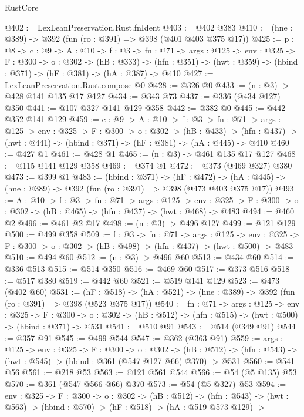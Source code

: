 \begin{lexlean}{RustCore}
\begin{coremodule}
{\begin{coremodule}
@402 := LexLeanPreservation.Rust.fnIdent
@403 := @402 @383
@410 := (hne : @389) -> @392 (fun (ro : @391) => @398 (@401 @403 @375 @17))
@425 := {p : @8} ->
  {c : @9} ->
  {A : @10} ->
  {f : @3} ->
  {fn : @71} ->
  {args : @125} ->
  {env : @325} ->
  {F : @300} ->
  {o : @302} ->
  (hB : @333) ->
  (hfn : @351) -> (hwt : @359) -> (hbind : @371) -> (hF : @381) -> (hA : @387) -> @410
@427 := LexLeanPreservation.Rust.compose @0
@428 := @326 @0
@433 := (n : @3) -> @428 @141 @135 @17 @127
@434 := @343 @73
@437 := @336 (@434 @127) @350
@441 := @107 @327 @141 @129 @358
@442 := @382 @0
@445 := @442 @352 @141 @129
@459 := {c : @9} ->
  {A : @10} ->
  {f : @3} ->
  {fn : @71} ->
  {args : @125} ->
  {env : @325} ->
  {F : @300} ->
  {o : @302} ->
  (hB : @433) ->
  (hfn : @437) -> (hwt : @441) -> (hbind : @371) -> (hF : @381) -> (hA : @445) -> @410
@460 := @427 @1
@461 := @428 @1
@465 := (n : @3) -> @461 @135 @17 @127
@468 := @115 @141 @129 @358
@469 := @374 @1
@472 := @373 (@469 @327) @380
@473 := @399 @1
@483 := (hbind : @371) ->
  (hF : @472) -> (hA : @445) -> (hne : @389) -> @392 (fun (ro : @391) => @398 (@473 @403 @375 @17))
@493 := {A : @10} ->
  {f : @3} ->
  {fn : @71} ->
  {args : @125} ->
  {env : @325} -> {F : @300} -> {o : @302} -> (hB : @465) -> (hfn : @437) -> (hwt : @468) -> @483
@494 := @460 @2
@496 := @461 @2 @17
@498 := (n : @3) -> @496 @127
@499 := @121 @129
@500 := @499 @358
@509 := {f : @3} ->
  {fn : @71} ->
  {args : @125} ->
  {env : @325} -> {F : @300} -> {o : @302} -> (hB : @498) -> (hfn : @437) -> (hwt : @500) -> @483
@510 := @494 @60
@512 := (n : @3) -> @496 @60
@513 := @434 @60
@514 := @336 @513
@515 := @514 @350
@516 := @469 @60
@517 := @373 @516
@518 := @517 @380
@519 := @442 @60
@521 := @519 @141 @129
@523 := @473 (@402 @60)
@531 := (hF : @518) -> (hA : @521) -> (hne : @389) -> @392 (fun (ro : @391) => @398 (@523 @375 @17))
@540 := {fn : @71} ->
  {args : @125} ->
  {env : @325} ->
  {F : @300} -> {o : @302} -> (hB : @512) -> (hfn : @515) -> (hwt : @500) -> (hbind : @371) -> @531
@541 := @510 @91
@543 := @514 (@349 @91)
@544 := @357 @91
@545 := @499 @544
@547 := @362 (@363 @91)
@559 := {args : @125} ->
  {env : @325} ->
  {F : @300} ->
  {o : @302} ->
  (hB : @512) -> (hfn : @543) -> (hwt : @545) -> (hbind : @361 (@547 @127 @66) @370) -> @531
@560 := @541 @56
@561 := @218 @53
@563 := @121 @561 @544
@566 := @54 (@5 @135) @53
@570 := @361 (@547 @566 @66) @370
@573 := @54 (@5 @327) @53
@594 := {env : @325} ->
  {F : @300} ->
  {o : @302} ->
  (hB : @512) ->
  (hfn : @543) ->
  (hwt : @563) ->
  (hbind : @570) ->
  (hF : @518) ->
  (hA : @519 @573 @129) ->

\end{coremodule}}
\end{coremodule}
\end{lexlean}
